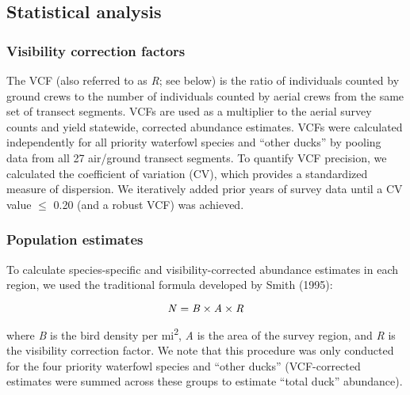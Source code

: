 \documentclass[
  12pt,
]{article}
\begin{document}
\hypertarget{statistical-analysis}{%
\subsection{Statistical analysis}\label{statistical-analysis}}

\hypertarget{visibility-correction-factors}{%
\subsubsection{Visibility correction
factors}\label{visibility-correction-factors}}

The VCF (also referred to as \emph{R}; see below) is the ratio of
individuals counted by ground crews to the number of individuals counted
by aerial crews from the same set of transect segments. VCFs are used as
a multiplier to the aerial survey counts and yield statewide, corrected
abundance estimates. VCFs were calculated independently for all priority
waterfowl species and ``other ducks'' by pooling data from all 27
air/ground transect segments. To quantify VCF precision, we calculated
the coefficient of variation (CV), which provides a standardized measure
of dispersion. We iteratively added prior years of survey data until a
CV value \(\leq\) 0.20 (and a robust VCF) was achieved.

\hypertarget{population-estimates}{%
\subsubsection{Population estimates}\label{population-estimates}}

To calculate species-specific and visibility-corrected abundance
estimates in each region, we used the traditional formula developed by
Smith (1995):

\begin{equation}
{\text{\textit{N}}} = {\text{\textit{B}}} \times {\text{\textit{A}}} \times {\text{\textit{R}}}
\end{equation}

where \emph{B} is the bird density per mi\textsuperscript{2}, \emph{A}
is the area of the survey region, and \emph{R} is the visibility
correction factor. We note that this procedure was only conducted for
the four priority waterfowl species and ``other ducks'' (VCF-corrected
estimates were summed across these groups to estimate ``total duck''
abundance).
\end{document}
